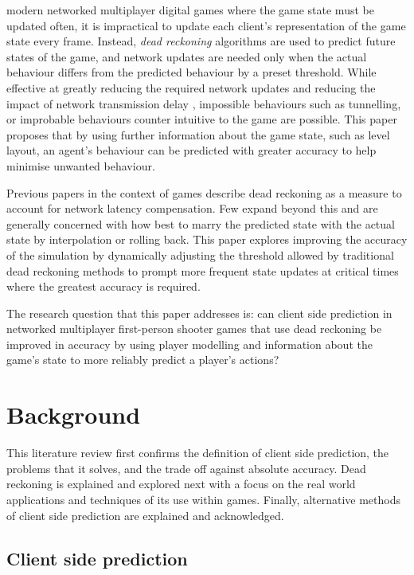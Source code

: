 \documentclass[journal]{IEEEtran}
\begin{document}
 modern networked multiplayer digital games where the game state must be updated often, it is impractical to update each client's representation of the game state every frame. Instead, \textit{dead reckoning} algorithms are used to predict future states of the game, and network updates are needed only when the actual behaviour differs from the predicted behaviour by a preset threshold. While effective at greatly reducing the required network updates and reducing the impact of network transmission delay \cite{pantel2002suitability}, impossible behaviours such as tunnelling, or improbable behaviours counter intuitive to the game are possible. This paper proposes that by using further information about the game state, such as level layout, an agent's behaviour can be predicted with greater accuracy to help minimise unwanted behaviour.

Previous papers in the context of games describe dead reckoning as a measure to account for network latency compensation. Few expand beyond this and are generally concerned with how best to marry the predicted state with the actual state by interpolation or rolling back. This paper explores improving the accuracy of the simulation by dynamically adjusting the threshold allowed by traditional dead reckoning methods to prompt more frequent state updates at critical times where the greatest accuracy is required.

The research question that this paper addresses is: can client side prediction in networked multiplayer first-person shooter games that use dead reckoning be improved in accuracy by using player modelling and information about the game's state to more reliably predict a player's actions?

\section{Background}

This literature review first confirms the definition of client side prediction, the problems that it solves, and the trade off against absolute accuracy. Dead reckoning is explained and explored next with a focus on the real world applications and techniques of its use within games. Finally, alternative methods of client side prediction are explained and acknowledged.

\subsection{Client side prediction}
\end{document}

